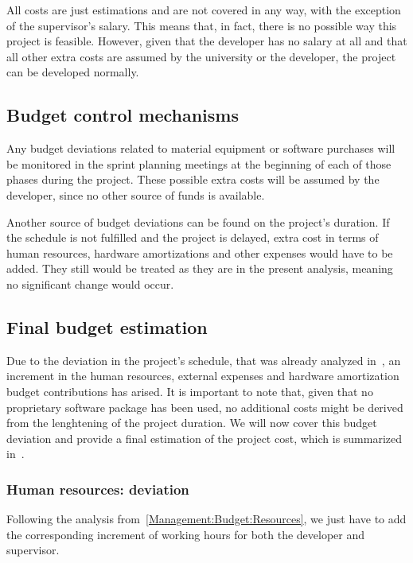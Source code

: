 All costs are just estimations and are not covered in any way, with the exception of the supervisor’s salary. This means that, in fact, there is no possible way this project is feasible. However, given that the developer has no salary at all and that all other extra costs are assumed by the university or the developer, the project can be developed normally.

\subsection{Budget control mechanisms}
\label{Management:Budget:Control}

Any budget deviations related to material equipment or software purchases will be monitored in the sprint planning meetings at the beginning of each of those phases during the project. These possible extra costs will be assumed by the developer, since no other source of funds is available.

Another source of budget deviations can be found on the project’s duration. If the schedule is not fulfilled and the project is delayed, extra cost in terms of human resources, hardware amortizations and other expenses would have to be added. They still would be treated as they are in the present analysis, meaning no significant change would occur.

\subsection{Final budget estimation}
\label{Management:Budget:Final}

Due to the deviation in the project's schedule, that was already analyzed in~, an increment in the human resources, external expenses and hardware amortization budget contributions has arised. It is important to note that, given that no proprietary software package has been used, no additional costs might be derived from the lenghtening of the project duration. We will now cover this budget deviation and provide a final estimation of the project cost, which is summarized in~.

\subsubsection*{Human resources: deviation}

Following the analysis from~\ref{Management:Budget:Resources}, we just have to add the corresponding increment of working hours for both the developer and supervisor.

